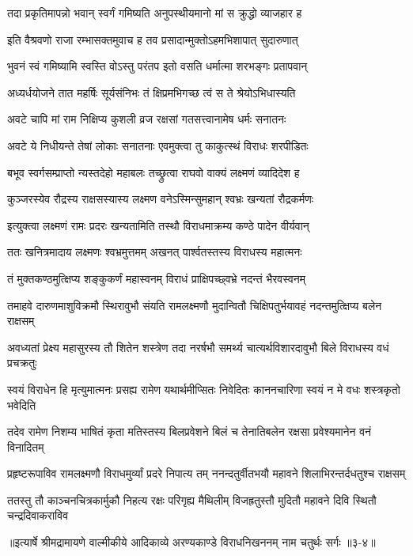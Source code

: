\twolineshloka
{तदा प्रकृतिमापन्नो भवान् स्वर्गं गमिष्यति}
{अनुपस्थीयमानो मां स क्रुद्धो व्याजहार ह} %

\twolineshloka
{इति वैश्रवणो राजा रम्भासक्तमुवाच ह}
{तव प्रसादान्मुक्तोऽहमभिशापात् सुदारुणात्} %

\twolineshloka
{भुवनं स्वं गमिष्यामि स्वस्ति वोऽस्तु परंतप}
{इतो वसति धर्मात्मा शरभङ्गः प्रतापवान्} %

\twolineshloka
{अध्यर्धयोजने तात महर्षिः सूर्यसंनिभः}
{तं क्षिप्रमभिगच्छ त्वं स ते श्रेयोऽभिधास्यति} %

\twolineshloka
{अवटे चापि मां राम निक्षिप्य कुशली व्रज}
{रक्षसां गतसत्त्वानामेष धर्मः सनातनः} %

\twolineshloka
{अवटे ये निधीयन्ते तेषां लोकाः सनातनाः}
{एवमुक्त्वा तु काकुत्स्थं विराधः शरपीडितः} %

\twolineshloka
{बभूव स्वर्गसम्प्राप्तो न्यस्तदेहो महाबलः}
{तच्छ्रुत्वा राघवो वाक्यं लक्ष्मणं व्यादिदेश ह} %

\twolineshloka
{कुञ्जरस्येव रौद्रस्य राक्षसस्यास्य लक्ष्मण}
{वनेऽस्मिन्सुमहान् श्वभ्रः खन्यतां रौद्रकर्मणः} %

\twolineshloka
{इत्युक्त्वा लक्ष्मणं रामः प्रदरः खन्यतामिति}
{तस्थौ विराधमाक्रम्य कण्ठे पादेन वीर्यवान्} %

\twolineshloka
{ततः खनित्रमादाय लक्ष्मणः श्वभ्रमुत्तमम्}
{अखनत् पार्श्वतस्तस्य विराधस्य महात्मनः} %

\twolineshloka
{तं मुक्तकण्ठमुत्क्षिप्य शङ्कुकर्णं महास्वनम्}
{विराधं प्राक्षिपच्छ्वभ्रे नदन्तं भैरवस्वनम्} %

\twolineshloka
{तमाहवे दारुणमाशुविक्रमौ स्थिरावुभौ संयति रामलक्ष्मणौ}
{मुदान्वितौ चिक्षिपतुर्भयावहं नदन्तमुत्क्षिप्य बलेन राक्षसम्} %

\twolineshloka
{अवध्यतां प्रेक्ष्य महासुरस्य तौ शितेन शस्त्रेण तदा नरर्षभौ}
{समर्थ्य चात्यर्थविशारदावुभौ बिले विराधस्य वधं प्रचक्रतुः} %

\twolineshloka
{स्वयं विराधेन हि मृत्युमात्मनः प्रसह्य रामेण यथार्थमीप्सितः}
{निवेदितः काननचारिणा स्वयं न मे वधः शस्त्रकृतो भवेदिति} %

\twolineshloka
{तदेव रामेण निशम्य भाषितं कृता मतिस्तस्य बिलप्रवेशने}
{बिलं च तेनातिबलेन रक्षसा प्रवेश्यमानेन वनं विनादितम्} %

\twolineshloka
{प्रहृष्टरूपाविव रामलक्ष्मणौ विराधमुर्व्यां प्रदरे निपात्य तम्}
{ननन्दतुर्वीतभयौ महावने शिलाभिरन्तर्दधतुश्च राक्षसम्} %

\twolineshloka
{ततस्तु तौ काञ्चनचित्रकार्मुकौ निहत्य रक्षः परिगृह्य मैथिलीम्}
{विजह्रतुस्तौ मुदितौ महावने दिवि स्थितौ चन्द्रदिवाकराविव} %


॥इत्यार्षे श्रीमद्रामायणे वाल्मीकीये आदिकाव्ये अरण्यकाण्डे विराधनिखननम् नाम चतुर्थः सर्गः ॥३-४॥

